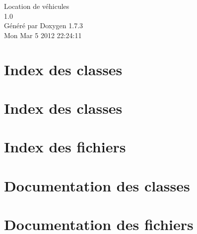 \documentclass[a4paper]{book}
\begin{document}
\hypersetup{pageanchor=false}
\begin{titlepage}
\vspace*{7cm}
\begin{center}
{\Large Location de véhicules \\[1ex]\large 1.0 }\\
\vspace*{1cm}
{\large Généré par Doxygen 1.7.3}\\
\vspace*{0.5cm}
{\small Mon Mar 5 2012 22:24:11}\\
\end{center}
\end{titlepage}
\clearemptydoublepage
{}
\tableofcontents
\clearemptydoublepage
{}
\hypersetup{pageanchor=true}
\chapter{Index des classes}

\chapter{Index des classes}

\chapter{Index des fichiers}

\chapter{Documentation des classes}













\chapter{Documentation des fichiers}












\printindex
\end{document}
